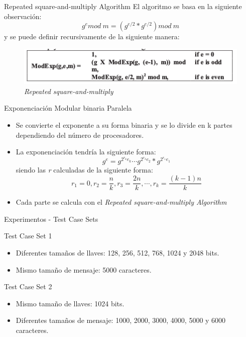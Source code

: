 \documentclass{beamer}c
\begin{document}
\begin{frame}{Repeated square-and-multiply Algorithm}
  El algoritmo se basa en la siguiente observación:
  $$g^{e} mod\:m = (g^{e/2} * g^{e/2}) mod\:m$$
  y se puede definir recursivamente de la siguiente manera:
  \begin{figure}
   \centering
   \includegraphics[scale = 0.5]{1.png}
   \caption{\textit{Repeated square-and-multiply} \cite{Paper}}
   \label{fig:1}
  \end{figure}
\end{frame}

\begin{frame}{Exponenciación Modular binaria Paralela}
\begin{itemize}
 \item Se convierte el exponente a su forma binaria y se lo divide en k partes dependiendo del número de procesadores.
 \item La exponenciación tendría la siguiente forma:
 $$g^{e} = g^{2^{r_{k}}e_{k}} \cdots g^{2^{r_{2}}e_{2}}*g^{2^{r_{1}}e_{1}}$$
 siendo las \textit{r} calculadas de la siguiente forma:
 $$r_{1} = 0, r_{2} = \frac{n}{k}, r_{3} = \frac{2n}{k},\cdots,r_{k} = \frac{(k-1)n}{k}$$
 \item Cada parte se calcula con el \textit{Repeated square-and-multiply Algorithm}
\end{itemize}
\end{frame}

\begin{frame}{Experimentos - Test Case Sets}
  \begin{block}{Test Case Set 1}
   \begin{itemize}
    \item Diferentes tamaños de llaves: 128, 256, 512, 768, 1024 y 2048 bits.
    \item Mismo tamaño de mensaje: 5000 caracteres.
   \end{itemize}
  \end{block}
  \begin{block}{Test Case Set 2}
   \begin{itemize}
    \item Mismo tamaño de llaves: 1024 bits.
    \item Diferentes tamaños de mensaje: 1000, 2000, 3000, 4000, 5000 y 6000 caracteres.
   \end{itemize}
  \end{block}
\end{frame}
\end{document}
